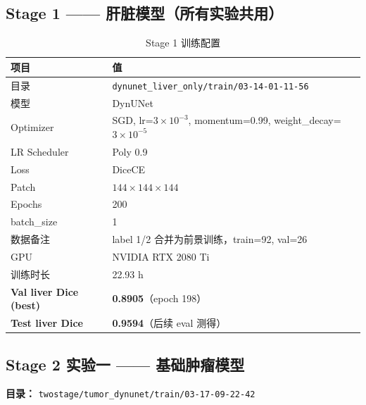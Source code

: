 \documentclass{article}
\begin{document}
	\subsection{Stage 1 —— 肝脏模型（所有实验共用）}
	
	\begin{table}[H]
		\centering
		\caption{Stage 1 训练配置}
		\begin{tabular}{ll}
			\hline
			\textbf{项目} & \textbf{值} \\
			\hline
			目录            & \texttt{dynunet\_liver\_only/train/03-14-01-11-56} \\
			模型            & DynUNet \\
			Optimizer       & SGD, lr=$3\times10^{-3}$, momentum=0.99, weight\_decay=$3\times10^{-5}$ \\
			LR Scheduler    & Poly 0.9 \\
			Loss            & DiceCE \\
			Patch           & $144\times144\times144$ \\
			Epochs          & 200 \\
			batch\_size     & 1 \\
			数据备注        & label 1/2 合并为前景训练，train=92, val=26 \\
			GPU             & NVIDIA RTX 2080 Ti \\
			训练时长        & 22.93 h \\
			\hline
			\textbf{Val liver Dice (best)} & \textbf{0.8905}（epoch 198） \\
			\textbf{Test liver Dice}       & \textbf{0.9594}（后续 eval 测得） \\
			\hline
		\end{tabular}
	\end{table}
	
	\subsection{Stage 2 实验一 —— 基础肿瘤模型}
	
	\noindent\textbf{目录：} \texttt{twostage/tumor\_dynunet/train/03-17-09-22-42}
	
\end{document}
